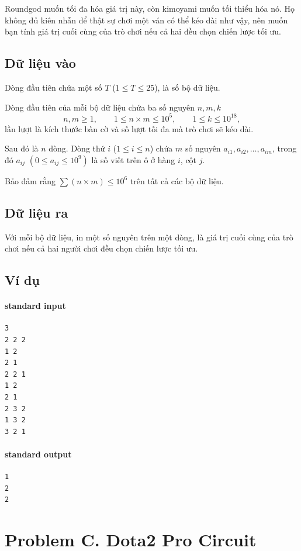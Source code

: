 \documentclass[11pt]{article}
\begin{document}
Roundgod muốn tối đa hóa giá trị này, còn kimoyami muốn tối thiểu hóa nó. Họ
không đủ kiên nhẫn để thật sự chơi một ván có thể kéo dài như vậy, nên muốn
bạn tính giá trị cuối cùng của trò chơi nếu cả hai đều chọn chiến lược tối ưu.

\subsection*{Dữ liệu vào}

Dòng đầu tiên chứa một số \(T\) (\(1\le T\le 25\)), là số bộ dữ liệu.

Dòng đầu tiên của mỗi bộ dữ liệu chứa ba số nguyên \(n,m,k\)
\[
  n,m\ge 1,\qquad 1\le n\times m\le 10^5,\qquad 1\le k\le 10^{18},
\]
lần lượt là kích thước bàn cờ và số lượt tối đa mà trò chơi sẽ kéo dài.

Sau đó là \(n\) dòng. Dòng thứ \(i\) (\(1\le i\le n\)) chứa \(m\) số nguyên
\(a_{i1},a_{i2},\ldots,a_{im}\), trong đó \(a_{ij}\)
\((0\le a_{ij}\le 10^9)\) là số viết trên ô ở hàng \(i\), cột \(j\).

Bảo đảm rằng \(\sum(n\times m)\le 10^6\) trên tất cả các bộ dữ liệu.

\subsection*{Dữ liệu ra}

Với mỗi bộ dữ liệu, in một số nguyên trên một dòng, là giá trị cuối cùng của
trò chơi nếu cả hai người chơi đều chọn chiến lược tối ưu.

\subsection*{Ví dụ}

\paragraph{standard input}
\begin{verbatim}
3
2 2 2
1 2
2 1
2 2 1
1 2
2 1
2 3 2
1 3 2
3 2 1
\end{verbatim}

\paragraph{standard output}
\begin{verbatim}
1
2
2
\end{verbatim}

\section{Problem C. Dota2 Pro Circuit}
\end{document}
